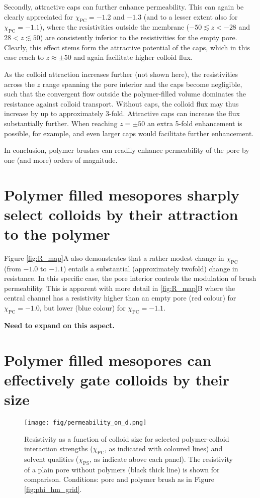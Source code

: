 \documentclass[12pt, a4paper]{article}
\begin{document}
Secondly, attractive caps can further enhance permeability.
This can again be clearly appreciated for $\chi_{\text{PC}}=-1.2$ and $-1.3$ (and to a lesser extent also for $\chi_{\text{PC}}=-1.1$), 
where the resistivities outside the membrane ($-50 \lesssim z<-28$ and $28<z \lesssim 50$) are consistently inferior to the resistivities for the empty pore. 
Clearly, this effect stems form the attractive potential of the caps, which in this case reach to $z \approx \pm 50$ and again facilitate higher colloid flux. 

As the colloid attraction increases further (not shown here), the resistivities across the $z$ range spanning the pore interior and the caps become negligible, 
such that the convergent flow outside the polymer-filled volume dominates the resistance against colloid transport.
Without caps, the colloid flux may thus increase by up to approximately 3-fold. 
Attractive caps can increase the flux substantially further.
When reaching $z=\pm 50$ an extra 5-fold enhancement is possible, for example, and even larger caps would facilitate further enhancement.

In conclusion, polymer brushes can readily enhance permeability of the pore by one (and more) orders of magnitude.


\section{Polymer filled mesopores sharply select colloids by their attraction to the polymer}

Figure \ref{fig:R_map}A also demonstrates that a rather modest change in $\chi_{\text{PC}}$ (from $-1.0$ to $-1.1$) entails a substantial (approximately twofold) change in resistance. 
In this specific case, the pore interior controls the modulation of brush permeability. 
This is apparent with more detail in \ref{fig:R_map}B where the central channel has a resistivity higher than an empty pore (red colour) for $\chi_{\text{PC}}=-1.0$, 
but lower (blue colour) for $\chi_{\text{PC}}=-1.1$. 

\textbf{Need to expand on this aspect.}


\section{Polymer filled mesopores can effectively gate colloids by their size}

\begin{figure}
    \centering
    \texttt{[image: fig/permeability\_on\_d.png]}
    \caption{
    Resistivity as a function of colloid size for selected polymer-colloid interaction strengths ($\chi_{\text{PC}}$, as indicated with coloured lines) 
    and solvent qualities ($\chi_{\text{PS}}$, as indicate above each panel). 
    The resistivity of a plain pore without polymers (black thick line) is shown for comparison. 
    Conditions: pore and polymer brush as in Figure \ref{fig:phi_hm_grid}. 
    }
    \label{fig:R_vs_d}
\end{figure}
\end{document}
